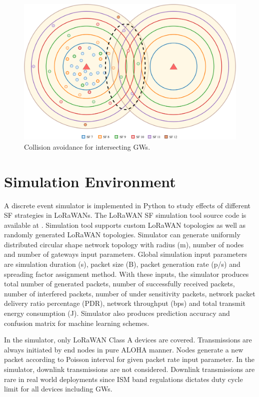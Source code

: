 \documentclass[conference]{IEEEtran}
\begin{document}
\begin{figure}
\centering
\includegraphics[width=\linewidth]{collision_solution_multi_gw}
\caption{Collision avoidance for intersecting GWs.}
\label{fig:collision_solution_multi_gw}
\end{figure}


\section{Simulation Environment} \label{Simulation Environment}
\par A discrete event simulator is implemented in Python to study effects of different SF strategies in LoRaWANs. The LoRaWAN SF simulation tool source code is available at \cite{simlorasf}. Simulation tool supports custom LoRaWAN topologies as well as randomly generated LoRaWAN topologies. Simulator can generate uniformly distributed circular shape network topology with radius (m), number of nodes and number of gateways input parameters. Global simulation input parameters are simulation duration (s), packet size (B), packet generation rate (p/s) and spreading factor assignment method. With these inputs, the simulator produces total number of generated packets, number of successfully received packets, number of interfered packets, number of under sensitivity packets, network packet delivery ratio percentage (PDR), network throughput (bps) and total transmit energy consumption (J). Simulator also produces  prediction accuracy and confusion matrix for machine learning schemes.

\par In the simulator, only LoRaWAN Class A devices are covered. Transmissions are always initiated by end nodes in pure ALOHA manner. Nodes generate a new packet according to Poisson interval for given packet rate input parameter. In the simulator, downlink transmissions are not considered. Downlink transmissions are rare in real world deployments since ISM band regulations dictates duty cycle limit for all devices including GWs.
\end{document}
